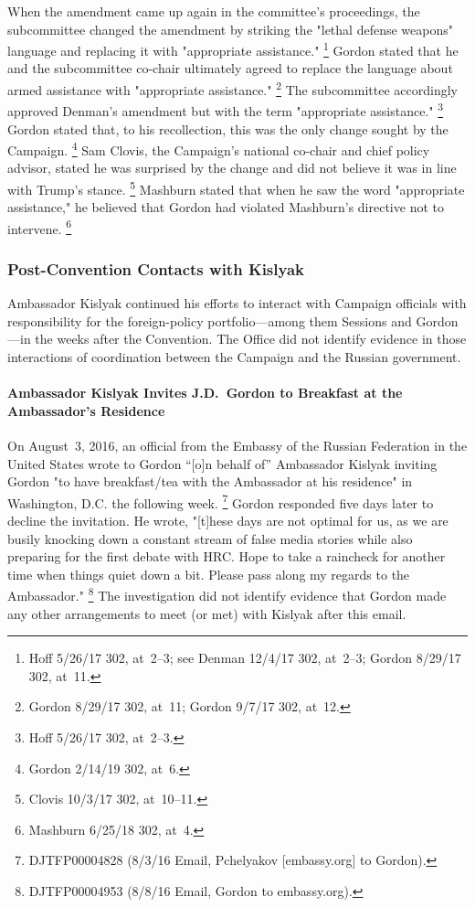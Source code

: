 When the amendment came up again in the committee's proceedings, the subcommittee changed the amendment by striking the "lethal defense weapons" language and replacing it with "appropriate assistance."%
\footnote{Hoff 5/26/17 302, at~2--3;
see Denman 12/4/17 302, at~2--3;
Gordon 8/29/17 302, at~11.}
Gordon stated that he and the subcommittee co-chair ultimately agreed to replace the language about armed assistance with "appropriate assistance."%
\footnote{Gordon 8/29/17 302, at~11;
Gordon 9/7/17 302, at~12.}
The subcommittee accordingly approved Denman's amendment but with the term "appropriate assistance."%
\footnote{Hoff 5/26/17 302, at~2--3.}
Gordon stated that, to his recollection, this was the only change sought by the Campaign.%
\footnote{Gordon 2/14/19 302, at~6.}
Sam Clovis, the Campaign's national co-chair and chief policy advisor, stated he was surprised by the change and did not believe it was in line with Trump's stance.%
\footnote{Clovis 10/3/17 302, at~10--11.}
Mashburn stated that when he saw the word "appropriate assistance," he believed that Gordon had violated Mashburn's directive not to intervene.%
\footnote{Mashburn 6/25/18 302, at~4.}

\subsubsection{Post-Convention Contacts with Kislyak}

Ambassador Kislyak continued his efforts to interact with Campaign officials with responsibility for the foreign-policy portfolio---among them Sessions and Gordon---in the weeks after the Convention.
The Office did not identify evidence in those interactions of coordination between the Campaign and the Russian government.

\paragraph{Ambassador Kislyak Invites J.D.~Gordon to Breakfast at the Ambassador's Residence}

On August~3, 2016, an official from the Embassy of the Russian Federation in the United States wrote to Gordon ``[o]n behalf of\thinspace'' Ambassador Kislyak inviting Gordon "to have breakfast/tea with the Ambassador at his residence" in Washington, D.C. the following week.%
\footnote{DJTFP00004828 (8/3/16 Email, Pchelyakov [embassy\@russianembassy.org] to Gordon).}
Gordon responded five days later to decline the invitation.
He wrote, "[t]hese days are not optimal for us, as we are busily knocking down a constant stream of false media stories while also preparing for the first debate with HRC\null.
Hope to take a raincheck for another time when things quiet down a bit.
Please pass along my regards to the Ambassador."%
\footnote{DJTFP00004953 (8/8/16 Email, Gordon to embassy\@russianembassy.org).}
The investigation did not identify evidence that Gordon made any other arrangements to meet (or met) with Kislyak after this email.

